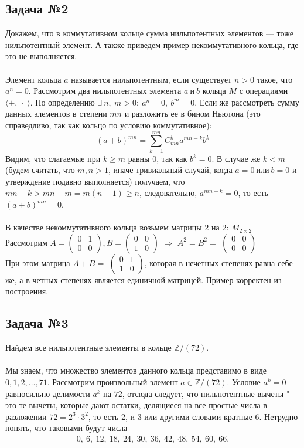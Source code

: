 \documentclass[a4paper,14pt]{article} %
\begin{document}
\subsection{Задача №2}
Докажем, что в коммутативном кольце сумма нильпотентных элементов — тоже нильпотентный элемент. А также приведем пример некоммутативного кольца, где это не выполняется.\\\\
Элемент кольца $a$ называется нильпотентным, если существует $n>0$ такое, что $a^n = 0$. Рассмотрим два нильпотентных элемента $a~и~b$ кольца $M$ с операциями $\langle+,~\cdot ~\rangle$. По определению $\exists~n,~m>0:~a^n = 0,~b^m = 0$. Если же рассмотреть сумму данных элементов в степени $mn$ и разложить ее в бином Ньютона (это справедливо, так как кольцо по условию коммутативное): $$(a+b)^{mn} = \sum\limits_{k = 1}^{mn}C_{mn}^{k}a^{mn - k}b^{k}$$
Видим, что слагаемые при $k\geq m$ равны $0$, так как $b^k = 0$. В случае же $k < m$ (будем считать, что $m,n>1$, иначе тривиальный случай, когда $a = 0~\text{или}~b = 0$ и утверждение подавно выполняется) получаем, что $mn-k>mn - m = m(n-1) \geq n$, следовательно, $a^{mn - k} = 0$, то есть $(a+b)^{mn} = 0$.\\\\
В качестве некоммутативного кольца возьмем матрицы 2 на 2: $M_{2\times2}$\\
Рассмотрим $A = 
\begin{pmatrix}
  0& 1\\
  0& 0
\end{pmatrix}, 
B = \begin{pmatrix}
  0& 0\\
  1& 0
\end{pmatrix}$ $\Rightarrow$ $A^2 = B^2 =$ $\begin{pmatrix}
  0& 0\\
  0& 0
\end{pmatrix}$ \\
При этом матрица $A+B=$ $\begin{pmatrix}
  0& 1\\
  1& 0
\end{pmatrix}$, которая в нечетных степенях равна себе же, а в четных степенях является единичной матрицей. Пример корректен из построения.
\subsection{Задача №3}
Найдем все нильпотентные элементы в кольце $\mathbb{Z}/(72)$.\\\\
Мы знаем, что множество элементов данного кольца представимо в виде $\overline{0}, \overline{1}, \overline{2}, \dots, \overline{71}$. Рассмотрим произвольный элемент $a \in \mathbb{Z} / (72)$. Условие $a^k = \overline{0}$ равносильно делимости $a^k$ на $72$, отсюда следует, что нильпотентные вычеты "--- это те вычеты, которые дают остатки, делящиеся на все простые числа в разложении $72 = 2^3 \cdot 3^2$, то есть 2, и 3 или другими словами кратные 6. Нетрудно понять, что таковыми будут числа \[ \overline{0},~\overline{6},~\overline{12},~ \overline{18},~ \overline{24}, ~\overline{30}, ~\overline{36}, ~\overline{42}, ~\overline{48},~ \overline{54},~ \overline{60},~ \overline{66}. \]
\end{document}
